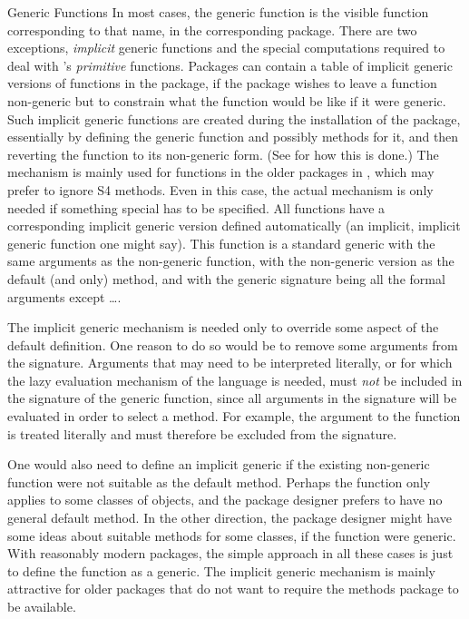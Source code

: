 \begin{Section}{Generic Functions}
In most cases, the generic function is the visible function
corresponding to that name, in the corresponding package.
There are two exceptions, \emph{implicit} generic
functions and the special computations required to deal with \R{}'s
\emph{primitive} functions.
Packages can contain a table of implicit generic versions of functions
in the package, if the package wishes to leave a function non-generic
but to constrain what the function would be like if it were generic.
Such implicit generic functions are created during the installation of
the package, essentially by defining the generic function and
possibly methods for it, and then reverting the function to its
non-generic form. (See  for how this is done.)
The mechanism is mainly used for functions in the older packages in
\R{}, which may prefer to ignore S4 methods.
Even in this case, the actual mechanism is only needed if something
special has to be specified.
All functions have a corresponding implicit generic version defined
automatically (an implicit, implicit generic function one might say).
This function is a standard generic with the same arguments as the
non-generic function, with the non-generic version as the default (and only)
method, and with the generic signature being all the formal arguments
except \dots.

The implicit generic mechanism is needed only to override some aspect
of the default definition.
One reason to do so would be to remove some arguments from the
signature.
Arguments that may need to be interpreted literally, or for which the
lazy evaluation mechanism of the language is needed, must \emph{not}
be included in the signature of the generic function, since all
arguments in the signature will be evaluated in order to select a
method.
For example, the argument  to the function
 is treated literally and must therefore be excluded
from the signature.

One would also need to define an implicit generic if the existing
non-generic function were not suitable as the default method.
Perhaps the function only applies to some classes of objects, and the
package designer prefers to have no general default method.
In the other direction, the package designer might have some ideas
about suitable methods for some classes, if the function were generic.
With reasonably modern packages, the simple approach in all these
cases is just to define the function as a generic.
The implicit generic mechanism is mainly attractive for older packages
that do not want to require the methods package to be available.


\end{Section}
